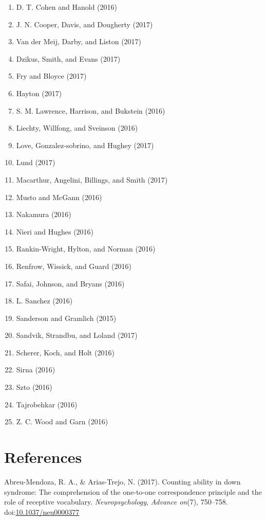 \documentclass[english,man]{apa6}
\providecommand{\tightlist}{%
  \setlength{\itemsep}{0pt}\setlength{\parskip}{0pt}}
\theoremstyle{definition}
\theoremstyle{definition}
\theoremstyle{definition}
\theoremstyle{remark}
\begin{document}
\begin{enumerate}
\def\labelenumi{\arabic{enumi})}
\tightlist
\item
  D. T. Cohen and Hanold (2016)
\item
  J. N. Cooper, Davis, and Dougherty (2017)
\item
  Van der Meij, Darby, and Liston (2017)
\item
  Dzikus, Smith, and Evans (2017)
\item
  Fry and Bloyce (2017)
\item
  Hayton (2017)
\item
  S. M. Lawrence, Harrison, and Bukstein (2016)
\item
  Liechty, Willfong, and Sveinson (2016)
\item
  Love, Gonzalez-sobrino, and Hughey (2017)
\item
  Lund (2017)
\item
  Macarthur, Angelini, Billings, and Smith (2017)
\item
  Musto and McGann (2016)
\item
  Nakamura (2016)
\item
  Nieri and Hughes (2016)
\item
  Rankin-Wright, Hylton, and Norman (2016)
\item
  Renfrow, Wissick, and Guard (2016)
\item
  Safai, Johnson, and Bryans (2016)
\item
  L. Sanchez (2016)
\item
  Sanderson and Gramlich (2015)
\item
  Sandvik, Strandbu, and Loland (2017)
\item
  Scherer, Koch, and Holt (2016)
\item
  Sirna (2016)
\item
  Szto (2016)
\item
  Tajrobehkar (2016)
\item
  Z. C. Wood and Garn (2016)
\end{enumerate}

\newpage

\section{References}\label{references}

\setlength{\parindent}{-0.5in} \setlength{\leftskip}{0.5in}

\hypertarget{refs}{}
\hypertarget{ref-Abreu-Mendoza2017}{}
Abreu-Mendoza, R. A., \& Arias-Trejo, N. (2017). Counting ability in
down syndrome: The comprehension of the one-to-one correspondence
principle and the role of receptive vocabulary. \emph{Neuropsychology},
\emph{Advance on}(7), 750--758.
doi:\href{https://doi.org/10.1037/neu0000377}{10.1037/neu0000377}
\end{document}
